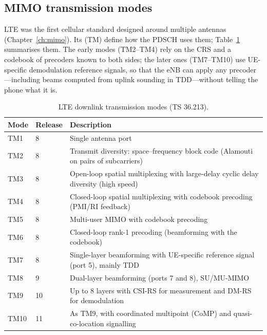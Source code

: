 
\subsection{MIMO transmission modes}

LTE was the first cellular standard designed around multiple antennas (Chapter~\ref{ch:mimo}). Its
 (TM) define how the PDSCH uses them; Table~\ref{tab:ch21:tm} summarises
them. The early modes (TM2--TM4) rely on the CRS and a codebook of precoders known to both sides; the
later ones (TM7--TM10) use UE-specific demodulation reference signals, so that the eNB can apply any
precoder---including beams computed from uplink sounding in TDD---without telling the phone what it
is.

\begin{table}[htbp]\centering\small
\caption{LTE downlink transmission modes (TS 36.213).}
\label{tab:ch21:tm}
\begin{tabularx}{\linewidth}{@{}l l X@{}}
\toprule
Mode & Release & Description\\
\midrule
TM1 & 8 & Single antenna port\\
TM2 & 8 & Transmit diversity: space--frequency block code (Alamouti on pairs of subcarriers)\\
TM3 & 8 & Open-loop spatial multiplexing with large-delay cyclic delay diversity (high speed)\\
TM4 & 8 & Closed-loop spatial multiplexing with codebook precoding (PMI/RI feedback)\\
TM5 & 8 & Multi-user MIMO with codebook precoding\\
TM6 & 8 & Closed-loop rank-1 precoding (beamforming with the codebook)\\
TM7 & 8 & Single-layer beamforming with UE-specific reference signal (port 5), mainly TDD\\
TM8 & 9 & Dual-layer beamforming (ports 7 and 8), SU/MU-MIMO\\
TM9 & 10 & Up to 8 layers with CSI-RS for measurement and DM-RS for demodulation\\
TM10 & 11 & As TM9, with coordinated multipoint (CoMP) and quasi-co-location signalling\\
\bottomrule
\end{tabularx}
\end{table}

